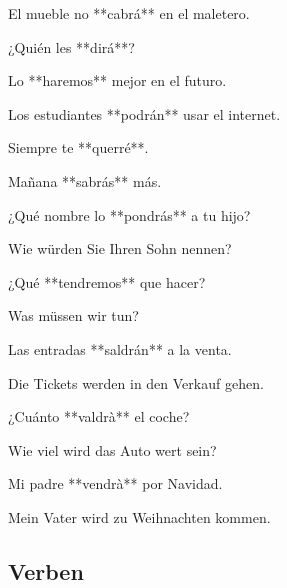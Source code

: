 \begin{compactitem}
    \item El mueble no **cabrá** en el maletero.
    \item ¿Quién les **dirá**?
    \item Lo **haremos** mejor en el futuro.
    \item Los estudiantes **podrán** usar el internet.
    \item Siempre te **querré**.
    \item Mañana **sabrás** más.
    \item ¿Qué nombre lo **pondrás** a tu hijo?
    \begin{compactitem}
        \item Wie würden Sie Ihren Sohn nennen?
    \end{compactitem}
    \item ¿Qué **tendremos** que hacer?
    \begin{compactitem}
        \item Was müssen wir tun?
    \end{compactitem}
    \item Las entradas **saldrán** a la venta.
    \begin{compactitem}
        \item Die Tickets werden in den Verkauf gehen.
    \end{compactitem}
    \item ¿Cuánto **valdrà** el coche?
    \begin{compactitem}
        \item Wie viel wird das Auto wert sein?
    \end{compactitem}
    \item Mi padre **vendrà** por Navidad.
    \begin{compactitem}
        \item Mein Vater wird zu Weihnachten kommen.
    \end{compactitem}
\end{compactitem}

\clearpage

\subsection*{Verben}

